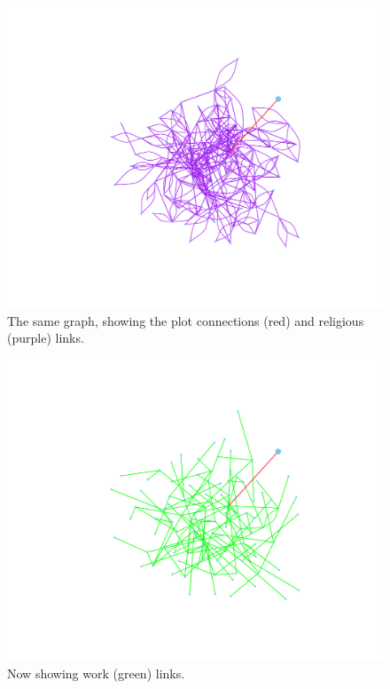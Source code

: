 \documentclass{article}
\newenvironment{rnwfig}[0]{\begin{figure}\begin{center}}{\end{center}\end{figure}}
\begin{document}
\begin{rnwfig}
\includegraphics{manuscript-religionAlt}
\caption{The same graph, showing the plot connections (red) and religious (purple) links.}
\end{rnwfig}

\begin{rnwfig}
\includegraphics{manuscript-workAlt}
\caption{Now showing work (green) links.}
\end{rnwfig}
\end{document}
